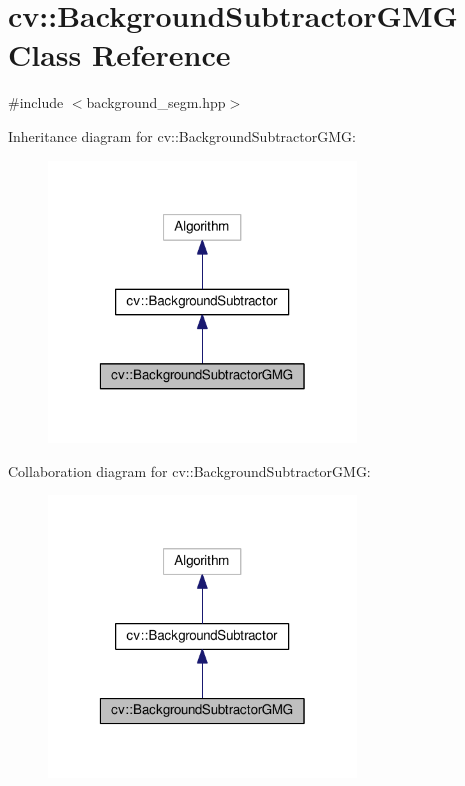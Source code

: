 \hypertarget{classcv_1_1BackgroundSubtractorGMG}{\section{cv\-:\-:Background\-Subtractor\-G\-M\-G Class Reference}
\label{classcv_1_1BackgroundSubtractorGMG}
}


{\ttfamily \#include $<$background\-\_\-segm.\-hpp$>$}



Inheritance diagram for cv\-:\-:Background\-Subtractor\-G\-M\-G\-:\nopagebreak
\begin{figure}[H]
\begin{center}
\leavevmode
\includegraphics[width=232pt]{classcv_1_1BackgroundSubtractorGMG__inherit__graph}
\end{center}
\end{figure}


Collaboration diagram for cv\-:\-:Background\-Subtractor\-G\-M\-G\-:\nopagebreak
\begin{figure}[H]
\begin{center}
\leavevmode
\includegraphics[width=232pt]{classcv_1_1BackgroundSubtractorGMG__coll__graph}
\end{center}
\end{figure}
